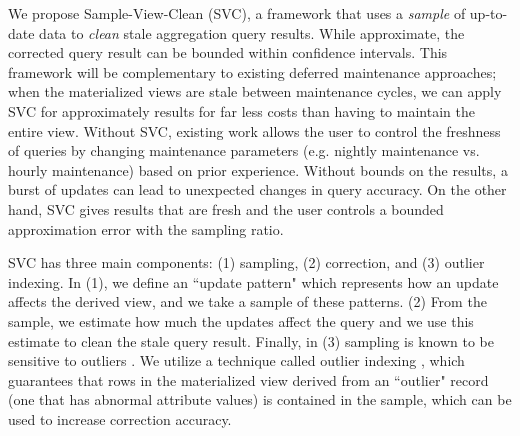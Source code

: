 We propose Sample-View-Clean (SVC), a framework that uses a \emph{sample} of up-to-date data to \emph{clean} stale aggregation query results.
While approximate, the corrected query result can be bounded within confidence intervals.
This framework will be complementary to existing deferred maintenance approaches; when the materialized views are stale between maintenance cycles, we can apply SVC for approximately results for far less costs than having to maintain the entire view.
Without SVC, existing work allows the user to control the freshness of queries by changing maintenance parameters (e.g. nightly maintenance vs. hourly maintenance) based on prior experience.
Without bounds on the results, a burst of updates can lead to unexpected changes in query accuracy.
On the other hand, SVC gives results that are fresh and the user controls a bounded approximation error with the sampling ratio.



SVC has three main components: (1) sampling, (2) correction, and (3) outlier indexing. In (1), we define an ``update pattern" which represents how an update affects the derived view, and we take a sample of these patterns. (2)  From the sample, we estimate how much the updates affect the query and we use this estimate to clean the stale query result.
Finally, in (3) sampling is known to be sensitive to outliers \cite{chaudhuri2001overcoming}.
We utilize a technique called outlier indexing \cite{chaudhuri2001overcoming}, which guarantees that rows in the materialized view derived from an ``outlier" record (one that has abnormal attribute values) is contained in the sample, which can be used to increase correction accuracy.

